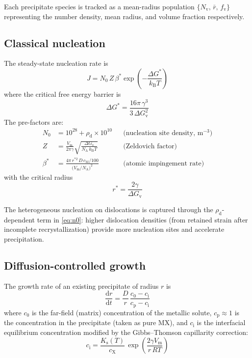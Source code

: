 \documentclass[11pt,a4paper]{article}
\newcommand{\rhod}{\ensuremath{\rho_\mathrm{d}}}
\newcommand{\fv}{\ensuremath{f_\mathrm{v}}}
\newcommand{\Nv}{\ensuremath{N_\mathrm{v}}}
\begin{document}
Each precipitate species is tracked as a mean-radius population
$\{\Nv,\,\bar r,\,\fv\}$ representing the number density, mean radius, and
volume fraction respectively.

\subsection{Classical nucleation}

The steady-state nucleation rate is
\begin{equation}
  J = N_0\, Z\, \beta^* \exp\!\left(-\frac{\Delta G^*}{k_\mathrm{B} T}\right)
  \label{eq:nucleation}
\end{equation}
where the critical free energy barrier is
\begin{equation}
  \Delta G^* = \frac{16\pi\,\gamma^3}{3\,\Delta G_\mathrm{v}^2}
  \label{eq:dgstar}
\end{equation}
The pre-factors are:
\begin{align}
  N_0 &= 10^{28} + \rhod \times 10^{10}
    & &\text{(nucleation site density, m$^{-3}$)}
    \label{eq:n0} \\[6pt]
  Z &= \frac{V_\mathrm{m}}{2\pi\gamma}
       \sqrt{\frac{\Delta G_\mathrm{v}}{N_\mathrm{A}\,k_\mathrm{B} T}}
    & &\text{(Zeldovich factor)}
    \label{eq:zeldovich} \\[6pt]
  \beta^* &= \frac{4\pi\,r^{*2}\,D\,c_\mathrm{M}/100}
                   {\bigl(V_\mathrm{m}/N_\mathrm{A}\bigr)^2}
    & &\text{(atomic impingement rate)}
    \label{eq:betastar}
\end{align}
with the critical radius
\begin{equation}
  r^* = \frac{2\gamma}{\Delta G_\mathrm{v}}
  \label{eq:rstar}
\end{equation}

The heterogeneous nucleation on dislocations is captured through the
$\rhod$-dependent term in \cref{eq:n0}: higher dislocation densities
(from retained strain after incomplete recrystallization) provide more
nucleation sites and accelerate precipitation.

\subsection{Diffusion-controlled growth}

The growth rate of an existing precipitate of radius $r$ is
\begin{equation}
  \frac{\mathrm{d}r}{\mathrm{d}t} = \frac{D}{r}\,
    \frac{c_0 - c_\mathrm{i}}{c_\mathrm{p} - c_\mathrm{i}}
  \label{eq:growth}
\end{equation}
where $c_0$ is the far-field (matrix) concentration of the metallic solute,
$c_\mathrm{p} \approx 1$ is the concentration in the precipitate (taken as
pure MX), and $c_\mathrm{i}$ is the interfacial equilibrium concentration
modified by the Gibbs--Thomson capillarity correction:
\begin{equation}
  c_\mathrm{i} = \frac{K_\mathrm{s}(T)}{c_\mathrm{X}}\,
    \exp\!\left(\frac{2\gamma V_\mathrm{m}}{r\,RT}\right)
  \label{eq:gibbs-thomson}
\end{equation}
\end{document}
